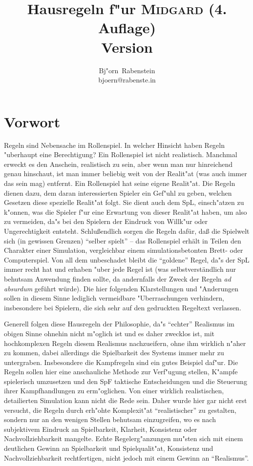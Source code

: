 \documentclass[10pt,a4paper,germanpar]{article}
\author{Bj"orn~Rabenstein\\ bjoern@rabenste.in}
\title{Hausregeln f"ur
  \textsc{Midgard} (4. Auflage)\\Version\gitReln}
\date{\gitAuthorDate}
\begin{document}
\maketitle


\section{Vorwort}

Regeln sind Nebensache im Rollenspiel. In welcher Hinsicht haben
Regeln "uberhaupt eine Berechtigung? Ein Rollenspiel ist nicht
realistisch. Manchmal erweckt es den Anschein, realistisch zu sein,
aber wenn man nur hinreichend genau hinschaut, ist man immer beliebig
weit von der Realit"at (was auch immer das sein mag) entfernt. Ein
Rollenspiel hat seine eigene Realit"at. Die Regeln dienen dazu, dem
daran interessierten Spieler ein Gef"uhl zu geben, welchen Gesetzen
diese spezielle Realit"at folgt. Sie dient auch dem SpL,
einsch"atzen zu k"onnen, was die Spieler f"ur eine Erwartung von
dieser Realit"at haben, um also zu vermeiden, da"s bei den Spielern
der Eindruck von Willk"ur oder Ungerechtigkeit entsteht. Schlußendlich
sorgen die Regeln dafür, daß die Spielwelt sich (in gewissen Grenzen)
"`selber spielt"' -- das Rollenspiel erhält in Teilen den Charakter
einer Simulation, vergleichbar einem simulationsbetonten Brett- oder
Computerspiel. Von all dem unbeschadet bleibt die "`goldene"' Regel,
da"s der SpL immer recht hat und erhaben "uber jede Regel ist
(was selbstverständlich nur behutsam Anwendung finden sollte, da
andernfalls der Zweck der Regeln \emph{ad absurdum} geführt würde). Die
hier folgenden Klarstellungen und "Anderungen sollen in diesem Sinne
lediglich vermeidbare "Uberraschungen verhindern, insbesondere bei
Spielern, die sich sehr auf den gedruckten Regeltext verlassen.

Generell folgen diese Hausregeln der Philosophie, da"s
"`echter"' Realismus im obigen Sinne ohnehin nicht m"oglich ist und es
daher zwecklos ist, mit hochkomplexen Regeln diesem Realismus
nachzueifern, ohne ihm wirklich n"aher zu kommen, dabei allerdings die
Spielbarkeit des Systems immer mehr zu untergraben. Insbesondere die
Kampfregeln sind ein gutes Beispiel daf"ur. Die Regeln sollen hier
eine anschauliche Methode zur Verf"ugung stellen, K"ampfe spielerisch
umzusetzen und den SpF taktische Entscheidungen und die Steuerung
ihrer Kampfhandlungen zu erm"oglichen. Von einer wirklich
realistischen, detailierten Simulation kann nicht die Rede sein. Daher
wurde hier gar nicht erst versucht, die Regeln durch erh"ohte
Komplexit"at "`realistischer"' zu gestalten, sondern nur an den
wenigen Stellen behutsam einzugreifen, wo es nach subjektivem Eindruck
an Spielbarkeit, Klarheit, Konsistenz oder Nachvollziehbarkeit
mangelte. Echte Regelerg"anzungen mu"sten sich mit einem deutlichen
Gewinn an Spielbarkeit und Spielqualit"at, Konsistenz und
Nachvollziehbarkeit rechtfertigen, nicht jedoch mit einem Gewinn an
"`Realismus"'.
\end{document}

